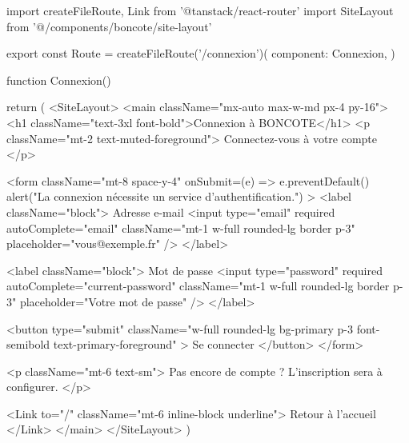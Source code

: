import { createFileRoute, Link } from '@tanstack/react-router'
import { SiteLayout } from '@/components/boncote/site-layout'

export const Route = createFileRoute('/connexion')({
  component: Connexion,
})

function Connexion() {
  return (
    <SiteLayout>
      <main className="mx-auto max-w-md px-4 py-16">
        <h1 className="text-3xl font-bold">Connexion à BONCOTE</h1>
        <p className="mt-2 text-muted-foreground">
          Connectez-vous à votre compte
        </p>

        <form
          className="mt-8 space-y-4"
          onSubmit={(e) => {
            e.preventDefault()
            alert("La connexion nécessite un service d'authentification.")
          }}
        >
          <label className="block">
            Adresse e-mail
            <input
              type="email"
              required
              autoComplete="email"
              className="mt-1 w-full rounded-lg border p-3"
              placeholder="vous@exemple.fr"
            />
          </label>

          <label className="block">
            Mot de passe
            <input
              type="password"
              required
              autoComplete="current-password"
              className="mt-1 w-full rounded-lg border p-3"
              placeholder="Votre mot de passe"
            />
          </label>

          <button
            type="submit"
            className="w-full rounded-lg bg-primary p-3 font-semibold text-primary-foreground"
          >
            Se connecter
          </button>
        </form>

        <p className="mt-6 text-sm">
          Pas encore de compte ? L'inscription sera à configurer.
        </p>

        <Link to="/" className="mt-6 inline-block underline">
          Retour à l'accueil
        </Link>
      </main>
    </SiteLayout>
  )
}
